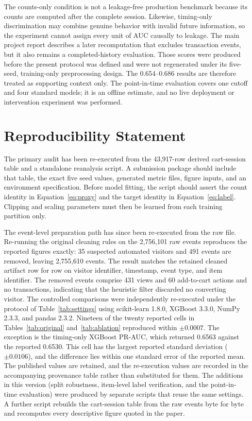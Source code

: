 \documentclass[conference, letterpaper]{IEEEtran}
\begin{document}
The counts-only condition is not a leakage-free production benchmark because its counts are computed after the complete session. Likewise, timing-only discrimination may combine genuine behavior with invalid future information, so the experiment cannot assign every unit of AUC causally to leakage. The main project report describes a later recomputation that excludes transaction events, but it also remains a completed-history evaluation. Those scores were produced before the present protocol was defined and were not regenerated under its five-seed, training-only preprocessing design. The 0.654--0.686 results are therefore treated as supporting context only. The point-in-time evaluation covers one cutoff and four standard models; it is an offline estimate, and no live deployment or intervention experiment was performed.

\section{Reproducibility Statement}
The primary audit has been re-executed from the 43,917-row derived cart-session table and a standalone reanalysis script. A submission package should include that table, the exact five seed values, generated metric files, figure inputs, and an environment specification. Before model fitting, the script should assert the count identity in Equation~\ref{eq:proxy} and the target identity in Equation~\ref{eq:label}. Clipping and scaling parameters must then be learned from each training partition only.

The event-level preparation path has since been re-executed from the raw file. Re-running the original cleaning rules on the 2,756,101 raw events reproduces the reported figures exactly: 35 suspected automated visitors and 491 events are removed, leaving 2,755,610 events. The result matches the retained cleaned artifact row for row on visitor identifier, timestamp, event type, and item identifier. The removed events comprise 431 views and 60 add-to-cart actions and no transactions, indicating that the heuristic filter discarded no converting visitor. The controlled comparisons were independently re-executed under the protocol of Table~\ref{tab:settings} using scikit-learn 1.8.0, XGBoost 3.3.0, NumPy 2.3.3, and pandas 2.3.2. Nineteen of the twenty reported cells in Tables~\ref{tab:original} and~\ref{tab:ablation} reproduced within $\pm 0.0007$. The exception is the timing-only XGBoost PR-AUC, which returned 0.6563 against the reported 0.6530. This cell has the largest reported standard deviation ($\pm 0.0106$), and the difference lies within one standard error of the reported mean. The published values are retained, and the re-execution values are recorded in the accompanying provenance table rather than substituted for them. The additions in this version (split robustness, item-level label verification, and the point-in-time evaluation) were produced by separate scripts that reuse the same settings. A further script rebuilds the cart-session table from the raw events byte for byte and recomputes every descriptive figure quoted in the paper.
\end{document}
